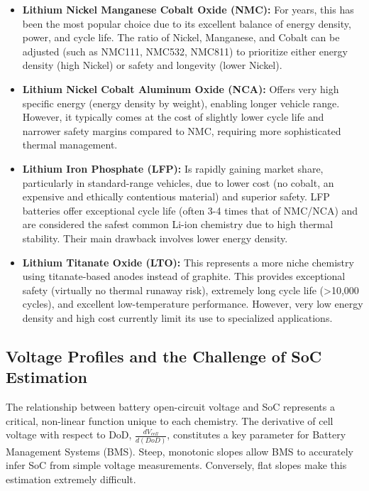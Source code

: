 \begin{itemize}
    \item \textbf{Lithium Nickel Manganese Cobalt Oxide (NMC):} For years, this has been the most popular choice due to its excellent balance of energy density, power, and cycle life. The ratio of Nickel, Manganese, and Cobalt can be adjusted (such as NMC111, NMC532, NMC811) to prioritize either energy density (high Nickel) or safety and longevity (lower Nickel).
    
    \item \textbf{Lithium Nickel Cobalt Aluminum Oxide (NCA):} Offers very high specific energy (energy density by weight), enabling longer vehicle range. However, it typically comes at the cost of slightly lower cycle life and narrower safety margins compared to NMC, requiring more sophisticated thermal management.
    
    \item \textbf{Lithium Iron Phosphate (LFP):} Is rapidly gaining market share, particularly in standard-range vehicles, due to lower cost (no cobalt, an expensive and ethically contentious material) and superior safety. LFP batteries offer exceptional cycle life (often 3-4 times that of NMC/NCA) and are considered the safest common Li-ion chemistry due to high thermal stability. Their main drawback involves lower energy density.
    
    \item \textbf{Lithium Titanate Oxide (LTO):} This represents a more niche chemistry using titanate-based anodes instead of graphite. This provides exceptional safety (virtually no thermal runaway risk), extremely long cycle life (>10,000 cycles), and excellent low-temperature performance. However, very low energy density and high cost currently limit its use to specialized applications.
\end{itemize}

\subsection{Voltage Profiles and the Challenge of SoC Estimation}

The relationship between battery open-circuit voltage and SoC represents a critical, non-linear function unique to each chemistry. The derivative of cell voltage with respect to DoD, $\frac{dV_{cell}}{d(DoD)}$, constitutes a key parameter for Battery Management Systems (BMS). Steep, monotonic slopes allow BMS to accurately infer SoC from simple voltage measurements. Conversely, flat slopes make this estimation extremely difficult.

